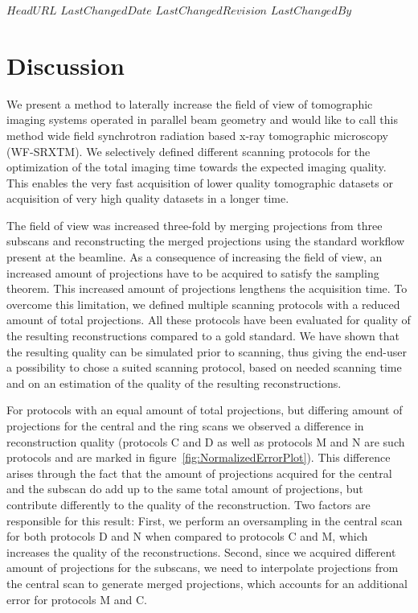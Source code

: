 \svnidlong
{$HeadURL$}
{$LastChangedDate$}
{$LastChangedRevision$}
{$LastChangedBy$}
%
%
\section{Discussion}\label{sec:Discussion}%

We present a method to laterally increase the field of view of tomographic imaging systems operated in parallel beam geometry and would like to call this method wide field synchrotron radiation based x-ray tomographic microscopy (WF-SRXTM). We selectively defined different scanning protocols for the optimization of the total imaging time towards the expected imaging quality. This enables the very fast acquisition of lower quality tomographic datasets or acquisition of very high quality datasets in a longer time.

The field of view was increased three-fold by merging projections from three subscans and reconstructing the merged projections using the standard workflow present at the beamline. As a consequence of increasing the field of view, an increased amount of projections have to be acquired to satisfy the sampling theorem. This increased amount of projections lengthens the acquisition time. To overcome this limitation, we defined multiple scanning protocols with a reduced amount of total projections. All these protocols have been evaluated for quality of the resulting reconstructions compared to a gold standard. We have shown that the resulting quality can be simulated prior to scanning, thus giving the end-user a possibility to chose a suited scanning protocol, based on needed scanning time and on an estimation of the quality of the resulting reconstructions.

For protocols with an equal amount of total projections, but differing amount of projections for the central and the ring scans we observed a difference in reconstruction quality (protocols C and D as well as protocols M and N are such protocols and are marked in figure~\ref{fig:NormalizedErrorPlot}). This difference arises through the fact that the amount of projections acquired for the central and the subscan do add up to the same total amount of projections, but contribute differently to the quality of the reconstruction. Two factors are responsible for this result: First, we perform an oversampling in the central scan for both protocols D and N when compared to protocols C and M, which increases the quality of the reconstructions. Second, since we acquired different amount of projections for the subscans, we need to interpolate projections from the central scan to generate merged projections, which accounts for an additional error for protocols M and C.


